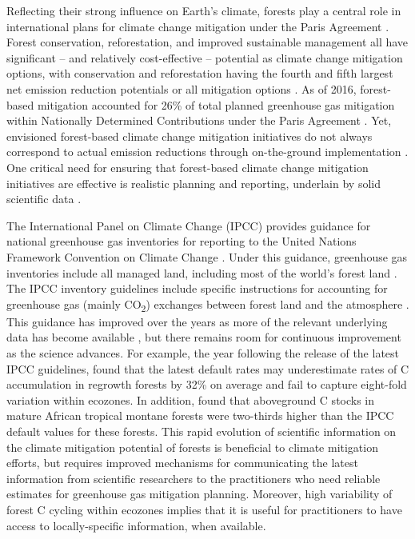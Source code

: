 \documentclass[, manuscript]{copernicus}
\begin{document}
Reflecting their strong influence on Earth's climate, forests play a
central role in international plans for climate change mitigation under
the Paris Agreement \citep{unfccc_adoption_2015}. Forest conservation,
reforestation, and improved sustainable management all have significant
-- and relatively cost-effective -- potential as climate change
mitigation options, with conservation and reforestation having the
fourth and fifth largest net emission reduction potentials or all
mitigation options \citep{ipcc_summary_2022}. As of 2016, forest-based
mitigation accounted for 26\% of total planned greenhouse gas mitigation
within Nationally Determined Contributions under the Paris Agreement
\citep{grassi_key_2017}. Yet, envisioned forest-based climate change
mitigation initiatives do not always correspond to actual emission
reductions through on-the-ground implementation
\citep[e.g.,][]{badgley_systematic_2022}. One critical need for ensuring
that forest-based climate change mitigation initiatives are effective is
realistic planning and reporting, underlain by solid scientific data
\citep{anderson-teixeira_effective_2022, deng_comparing_2021}.

The International Panel on Climate Change (IPCC) provides guidance for
national greenhouse gas inventories for reporting to the United Nations
Framework Convention on Climate Change
\citep[UNFCCC,][]{ipcc_2006_2006, ipcc_2019_2019}. Under this guidance,
greenhouse gas inventories include all managed land, including most of
the world's forest land \citep{ogle_delineating_2018}. The IPCC
inventory guidelines include specific instructions for accounting for
greenhouse gas (mainly CO\textsubscript{2}) exchanges between forest
land and the atmosphere \citep{ipcc_agriculture_2006, ipcc_2019_2019}.
This guidance has improved over the years as more of the relevant
underlying data has become available
\citep{requenasuarez_estimating_2019, rozendaal_aboveground_2022}, but
there remains room for continuous improvement as the science advances.
For example, the year following the release of the latest IPCC
guidelines, \citet{cook-patton_mapping_2020} found that the latest
default rates may underestimate rates of C accumulation in regrowth
forests by 32\% on average and fail to capture eight-fold variation
within ecozones. In addition, \citet{cuni-sanchez_high_2021} found that
aboveground C stocks in mature African tropical montane forests were
two-thirds higher than the IPCC default values for these forests. This
rapid evolution of scientific information on the climate mitigation
potential of forests is beneficial to climate mitigation efforts, but
requires improved mechanisms for communicating the latest information
from scientific researchers to the practitioners who need reliable
estimates for greenhouse gas mitigation planning. Moreover, high
variability of forest C cycling within ecozones
\citep[e.g.,][]{cook-patton_mapping_2020, refs} implies that it is
useful for practitioners to have access to locally-specific information,
when available.
\end{document}

